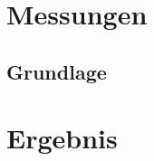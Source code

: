 \documentclass[11pt]{scrartcl}
\begin{document}
\pagebreak
\section{Messungen}
\subsection{Grundlage}
\fancyhead[R]{}

\pagebreak
\section{Ergebnis}

\thispagestyle{empty}

\renewcommand*{\biburlprefix}{(URL: }
\renewcommand*{\biburlsuffix}{)}

\pagebreak
{} %


\appendix

\end{document}
